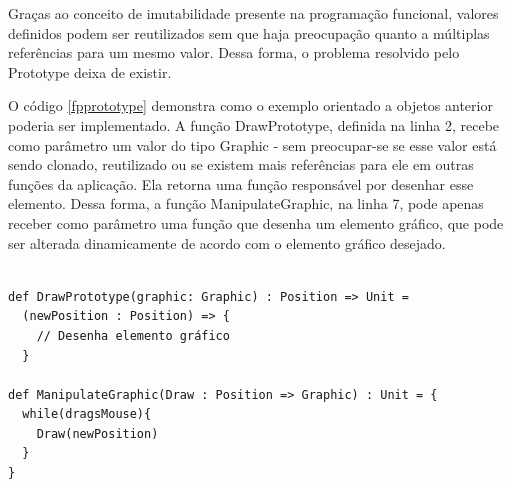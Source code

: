 Graças ao conceito de imutabilidade presente na 
programação funcional, valores definidos podem 
ser reutilizados sem que haja preocupação 
quanto a múltiplas referências para um mesmo valor. 
Dessa forma, o problema resolvido pelo Prototype 
deixa de existir.

O código \ref{fpprototype} demonstra como o 
exemplo orientado a objetos anterior poderia 
ser implementado. A função DrawPrototype, 
definida na linha 2, recebe como parâmetro um 
valor do tipo Graphic - sem preocupar-se se 
esse valor está sendo clonado, reutilizado ou 
se existem mais referências para ele em outras 
funções da aplicação. Ela retorna uma função 
responsável por desenhar esse elemento. Dessa 
forma, a função ManipulateGraphic, na linha 
7, pode apenas receber como parâmetro uma função 
que desenha um elemento gráfico, que pode ser 
alterada dinamicamente de acordo com o elemento 
gráfico desejado.

\begin{lstlisting}[caption={Prototype Funcional},label=fpprototype]
    
def DrawPrototype(graphic: Graphic) : Position => Unit =
  (newPosition : Position) => {
    // Desenha elemento gráfico
  }

def ManipulateGraphic(Draw : Position => Graphic) : Unit = {
  while(dragsMouse){
    Draw(newPosition)
  }
}
    
\end{lstlisting}